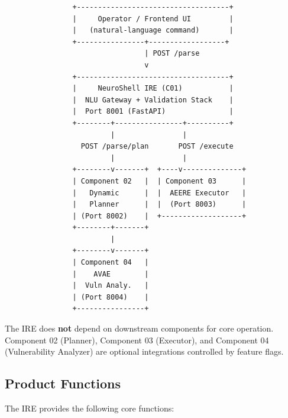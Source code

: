 \documentclass[10pt,journal,onecolumn]{IEEEtran}
\begin{document}
\begin{lstlisting}
                +------------------------------------+
                |     Operator / Frontend UI         |
                |   (natural-language command)       |
                +----------------+------------------+
                                 | POST /parse
                                 v
                +------------------------------------+
                |     NeuroShell IRE (C01)           |
                |  NLU Gateway + Validation Stack    |
                |  Port 8001 (FastAPI)               |
                +--------+----------------+----------+
                         |                |
                  POST /parse/plan       POST /execute
                         |                |
                +--------v-------+  +----v--------------+
                | Component 02   |  | Component 03      |
                |   Dynamic      |  |  AEERE Executor   |
                |   Planner      |  |  (Port 8003)      |
                | (Port 8002)    |  +-------------------+
                +--------+-------+
                         |
                +--------v-------+
                | Component 04   |
                |    AVAE        |
                |  Vuln Analy.   |
                | (Port 8004)    |
                +----------------+
\end{lstlisting}

The IRE does \textbf{not} depend on downstream components for core operation. Component 02 (Planner), Component 03 (Executor), and Component 04 (Vulnerability Analyzer) are optional integrations controlled by feature flags.

\subsection{Product Functions}
The IRE provides the following core functions:
\end{document}
